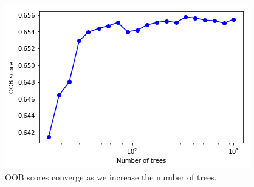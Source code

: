 \documentclass[]{article}
\begin{document}
\begin{figure}[H]
	\center \includegraphics[scale=.7]{RF_OOB_scores_CV}
	\caption{OOB scores converge as we increase the number of trees.}
\end{figure}
\end{document}

